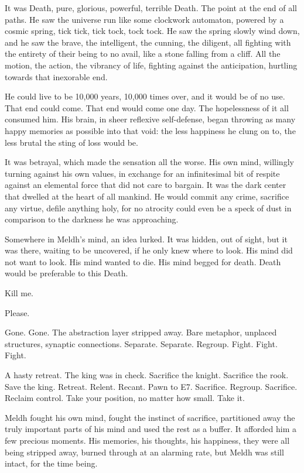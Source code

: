 It was Death, pure, glorious, powerful, terrible Death. The point at the end of all paths. He saw the universe run like some clockwork automaton, powered by a cosmic spring, tick tick, tick tock, tock tock. He saw the spring slowly wind down, and he saw the brave, the intelligent, the cunning, the diligent, all fighting with the entirety of their being to no avail, like a stone falling from a cliff. All the motion, the action, the vibrancy of life, fighting against the anticipation, hurtling towards that inexorable end.

He could live to be 10,000 years, 10,000 times over, and it would be of no use. That end could come. That end would come one day. The hopelessness of it all consumed him. His brain, in sheer reflexive self-defense, began throwing as many happy memories as possible into that void: the less happiness he clung on to, the less brutal the sting of loss would be.

It was betrayal, which made the sensation all the worse. His own mind, willingly turning against his own values, in exchange for an infinitesimal bit of respite against an elemental force that did not care to bargain. It was the dark center that dwelled at the heart of all mankind. He would commit any crime, sacrifice any virtue, defile anything holy, for no atrocity could even be a speck of dust in comparison to the darkness he was approaching.

Somewhere in Meldh’s mind, an idea lurked. It was hidden, out of sight, but it was there, waiting to be uncovered, if he only knew where to look. His mind did not want to look. His mind wanted to die. His mind begged for death. Death would be preferable to this Death.

Kill me.

Please.

Gone. Gone. The abstraction layer stripped away. Bare metaphor, unplaced structures, synaptic connections. Separate. Separate. Regroup. Fight. Fight. Fight.

A hasty retreat. The king was in check. Sacrifice the knight. Sacrifice the rook. Save the king. Retreat. Relent. Recant. Pawn to E7. Sacrifice. Regroup. Sacrifice. Reclaim control. Take your position, no matter how small. Take it.

Meldh fought his own mind, fought the instinct of sacrifice, partitioned away the truly important parts of his mind and used the rest as a buffer. It afforded him a few precious moments. His memories, his thoughts, his happiness, they were all being stripped away, burned through at an alarming rate, but Meldh was still intact, for the time being.

